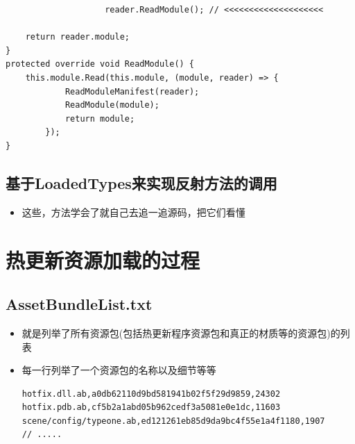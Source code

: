 \documentclass[9pt, b5paper]{article}
\begin{document}
\begin{enumerate}
\begin{enumerate}
\begin{itemize}
\begin{verbatim}
                    reader.ReadModule(); // <<<<<<<<<<<<<<<<<<<< 

    return reader.module;
}
protected override void ReadModule() {
    this.module.Read(this.module, (module, reader) => {
            ReadModuleManifest(reader);
            ReadModule(module);
            return module;
        });
}
\end{verbatim}
\end{itemize}
\end{enumerate}
\end{enumerate}
\subsection{基于LoadedTypes来实现反射方法的调用}
\label{sec-9-2}
\begin{itemize}
\item 这些，方法学会了就自己去追一追源码，把它们看懂
\end{itemize}

\section{热更新资源加载的过程}
\label{sec-10}
\subsection{AssetBundleList.txt}
\label{sec-10-1}
\begin{itemize}
\item 就是列举了所有资源包(包括热更新程序资源包和真正的材质等的资源包)的列表
\item 每一行列举了一个资源包的名称以及细节等等
\begin{verbatim}
hotfix.dll.ab,a0db62110d9bd581941b02f5f29d9859,24302
hotfix.pdb.ab,cf5b2a1abd05b962cedf3a5081e0e1dc,11603
scene/config/typeone.ab,ed121261eb85d9da9bc4f55e1a4f1180,1907
// .....
\end{verbatim}
\end{itemize}
\end{document}
